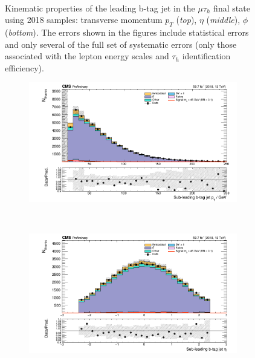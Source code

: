 \begin{figure}[ht]
\begin{subfigure}{0.75\textwidth}
    \end{subfigure} \\       
    \caption{Kinematic properties of the leading b-tag jet in the $\mu\tau_{h}$ final state using 2018 samples: transverse momentum $p_{T}$ (\textit{top}), $\eta$ (\textit{middle}), $\phi$ (\textit{bottom}). The errors shown in the figures include statistical errors and only several of the full set of systematic errors (only those associated with the lepton energy scales and $\tau_{h}$ identification efficiency).}
    \label{fig:nanoAOD_mutau_control_plots_btagjets_leading}
\end{figure}


\begin{figure}[ht]
    \centering
    \begin{subfigure}{0.75\textwidth}
        \includegraphics[width=1.0\textwidth]{figures/ch-11-asymmetric/mutau_bpt_deepflavour_2.png}
    \end{subfigure} \\
    \begin{subfigure}{0.75\textwidth}
        \includegraphics[width=1.0\textwidth]{figures/ch-11-asymmetric/mutau_beta_deepflavour_2.png}

\end{subfigure}
\end{figure}
